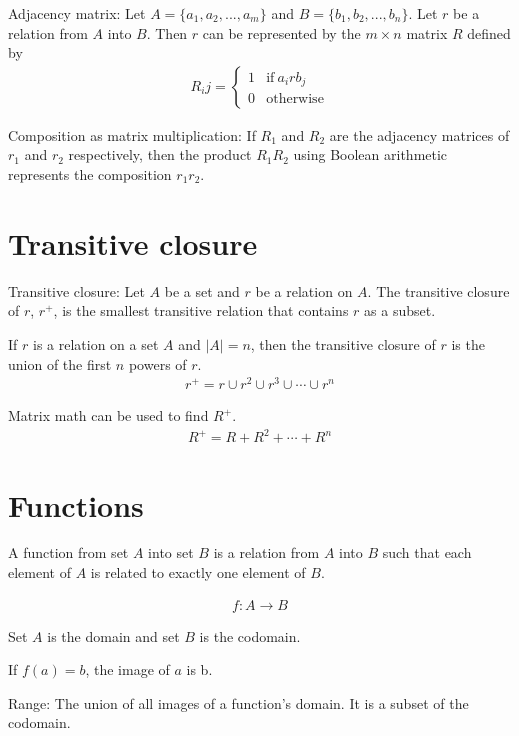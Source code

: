 \documentclass{article}
\begin{document}
Adjacency matrix: Let $A = \{a_1, a_2,..., a_m\}$ and $B = \{b_1, b_2,..., b_n\}$. Let $r$ be a relation from $A$ into $B$. Then $r$ can be represented by the $m \times n$ matrix $R$ defined by
\begin{gather*}
    R_ij = 
    \begin{cases}
        1 & \text{if}\ a_i r b_j \\
        0 & \text{otherwise}
    \end{cases}
\end{gather*}

Composition as matrix multiplication: If $R_1$ and $R_2$ are the adjacency matrices of $r_1$ and $r_2$ respectively, then the product $R_1 R_2$ using Boolean arithmetic represents the composition $r_1 r_2$.

\section{Transitive closure}

Transitive closure: Let $A$ be a set and $r$ be a relation on $A$. The transitive closure of $r$, $r^+$, is the smallest transitive relation that contains $r$ as a subset.

If $r$ is a relation on a set $A$ and $|A| = n$, then the transitive closure of $r$ is the union of the first $n$ powers of $r$.
\begin{gather*}
    r^+ = r \cup r^2 \cup r^3 \cup \cdots \cup r^n
\end{gather*}

Matrix math can be used to find $R^+$.
\begin{gather*}
    R^+ = R + R^2 + \cdots + R^n
\end{gather*}

\section{Functions}

A function from set $A$ into set $B$ is a relation from $A$ into $B$ such that each element of $A$ is related to exactly one element of $B$.

\begin{gather*}
    f: A \rightarrow B
\end{gather*}

Set $A$ is the domain and set $B$ is the codomain.

If $f(a) = b$, the image of $a$ is b.

Range: The union of all images of a function's domain. It is a subset of the codomain.
\end{document}

